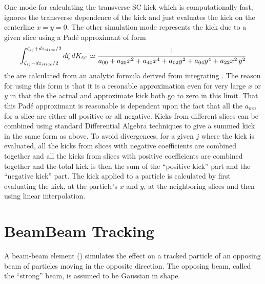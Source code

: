 One mode for calculating the transverse SC kick which is computationally fast, ignores the
transverse dependence of the kick and just evaluates the kick on the centerline $x = y =
0$. The other simulation mode represents the kick due to a given slice using a Pad{\'e}
approximant of form
\begin{equation}
  \int_{\zeta_{ij}-dz_{slice}/2}^{\zeta_{ij}+dz_{slice}/2} d\zeta \, dK_{\mbox{\tiny SC}}
  \simeq \frac{1}{a_{00} + a_{20} x^2 + a_{40} x^4 + a_{02} y^2 + a_{04} y^4 + a_{22} x^2 \, y^2}
\end{equation}
the  are calculated from an analytic formula derived from integrating . The
reason for using this form is that it is a resonable approximation even for very large $x$ or $y$ in
that the the actual and approximate kick both go to zero in this limit. That this Pad{\'e}
approximant is reasonable is dependent upon the fact that all the $a_{mn}$ for a slice are either
all positive or all negative. Kicks from different slices can be combined using standard
Differential Algebra techniques to give a summed kick in the same form as above. To avoid
divergences, for a given $j$ where the kick is evaluated, all the kicks from slices with negative
coefficients are combined together and all the kicks from slices with positive coefficients are
combined together and the total kick is then the sum of the ``positive kick'' part and the
``negative kick'' part. The kick applied to a particle is calculated by first evaluating the kick,
at the particle's $x$ and $y$, at the neighboring slices and then using linear interpolation.

\section{BeamBeam Tracking}
\label{s:beambeam.std}

A beam-beam element () simulates the effect on a tracked
particle of an opposing beam of particles moving in the opposite
direction. The opposing beam, called the ``strong'' beam, is assumed
to be Gaussian in shape.

